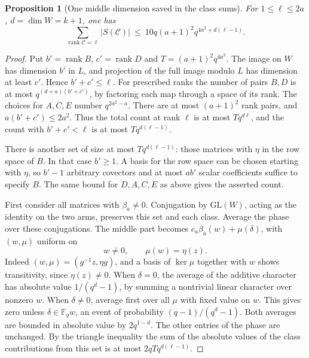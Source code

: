 \documentclass[a4paper,11pt]{article}
\newtheorem{proposition}{Proposition}[section]
\theoremstyle{definition}
\theoremstyle{remark}
\numberwithin{equation}{section}
\begin{document}
\begin{proposition}[One middle dimension saved in the class sums]
\leavevmode\label{prop:middlecancellation882}
For \(1\le\ell\le2a\), \(d=\dim W=k+1\), one has
\begin{equation}
 \sum_{\operatorname{rank}\mathcal C=\ell}|S(\mathcal C)|
   \ \le\ 10q(a+1)^2q^{4a^2+d(\ell-1)} .
 \label{eq:middlecancellation882}
\end{equation}
\end{proposition}
\begin{proof}
Put \(b'=\operatorname{rank}B\), \(c'=\operatorname{rank}D\)
and \(T=(a+1)^2q^{4a^2}\). The image on \(W\) has dimension
\(b'\) in \(L\), and projection of the full image modulo \(L\)
has dimension at least \(c'\). Hence \(b'+c'\le\ell\). For
prescribed ranks the number of pairs \(B,D\) is at most
\(q^{(d+a)(b'+c')}\), by factoring each map through a space of
its rank. The choices for \(A,C,E\) number
\(q^{2a^2-a}\). There are at most \((a+1)^2\) rank pairs, and
\(a(b'+c')\le2a^2\). Thus the total count at rank \(\ell\) is
at most \(Tq^{d\ell}\), and the count with \(b'+c'<\ell\) is
at most \(Tq^{d(\ell-1)}\).

There is another set of size at most \(Tq^{d(\ell-1)}\): those
matrices with \(\eta\) in the row space of \(B\). In that case
\(b'\ge1\). A basis for the row space can be chosen starting with
\(\eta\), so \(b'-1\) arbitrary covectors and at most \(ab'\)
scalar coefficients suffice to specify \(B\). The same bound
for \(D,A,C,E\) as above gives the asserted count.

First consider all matrices with \(\beta_a\ne0\).
Conjugation by \(\mathrm{GL}(W)\), acting as the identity on the
two arms, preserves this set and each class. Average the phase
over these conjugations. The middle part becomes
\(c_a\beta_a(w)+\mu(\delta)\), with \((w,\mu)\) uniform on
\[
    w\ne0,\qquad \mu(w)=\eta(z).
\]
Indeed \((w,\mu)=(g^{-1}z,\eta g)\), and a basis of \(\ker\mu\)
together with \(w\) shows transitivity, since \(\eta(z)\ne0\).
When \(\delta=0\), the average of the additive character has
absolute value \(1/(q^d-1)\), by summing a nontrivial linear
character over nonzero \(w\). When \(\delta\ne0\), average first
over all \(\mu\) with fixed value on \(w\). This gives zero unless
\(\delta\in\mathbb F_qw\), an event of probability
\((q-1)/(q^d-1)\). Both averages are bounded in absolute value
by \(2q^{1-d}\). The other entries of the phase are unchanged.
By the triangle inequality the sum of the absolute values of
the class contributions from this set is at most
\(2qTq^{d(\ell-1)}\).


\end{proof}
\end{document}
